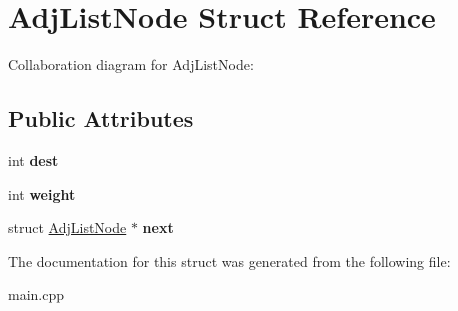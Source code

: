 \hypertarget{struct_adj_list_node}{}\section{Adj\+List\+Node Struct Reference}
\label{struct_adj_list_node}


Collaboration diagram for Adj\+List\+Node\+:
\subsection*{Public Attributes}
\begin{DoxyCompactItemize}
\item 
\mbox{\label{struct_adj_list_node_a5e3a8cdea9900b927f140f21685d35c0}} 
int {\bfseries dest}
\item 
\mbox{\label{struct_adj_list_node_ac1c361e92cf8d6da8bae9a0802169643}} 
int {\bfseries weight}
\item 
\mbox{\label{struct_adj_list_node_ad07931f1bcb5ab15b9baf380a118242c}} 
struct \hyperlink{struct_adj_list_node}{Adj\+List\+Node} $\ast$ {\bfseries next}
\end{DoxyCompactItemize}


The documentation for this struct was generated from the following file\+:\begin{DoxyCompactItemize}
\item 
main.\+cpp\end{DoxyCompactItemize}
